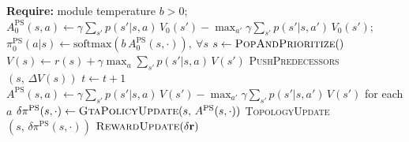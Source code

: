 \documentclass[10pt,a4paper]{article}
\begin{document}
\begin{algorithm}[!h]
\caption{DP + GTA-PS}
\begin{algorithmic}[1]
\Statex \textbf{Require:} module temperature $b>0$;\quad $A^{\mathrm{PS}}_0(s,a) \gets \gamma\sum_{s'} p(s'|s,a)\,V_0(s') - \max_{a'}\gamma\sum_{s'} p(s'|s,a')\,V_0(s')$;\quad $\pi^{\mathrm{PS}}_0(a|s) \gets \mathrm{softmax}(b\,A^{\mathrm{PS}}_0(s,\cdot)),\ \forall s$
   
    \State $s \gets \textsc{PopAndPrioritize}()$
    \State $V(s) \gets r(s) + \gamma\max_a\sum_{s'} p(s'|s,a)\,V(s')$ 
    \State \textsc{PushPredecessors}$(s,\, \Delta V(s))$
  \EndFor
  \State $t \leftarrow t + 1$
    \State $A^{\mathrm{PS}}(s,a) \gets \gamma\sum_{s'} p(s'|s,a)\,V(s') - \max_{a'}\gamma\sum_{s'} p(s'|s,a')\,V(s')$ for each $a$ 
    \State $\delta\pi^{\mathrm{PS}}(s,\cdot) \gets \textsc{GtaPolicyUpdate}(s,\,A^{\mathrm{PS}}(s,\cdot))$ 
    \State \textsc{TopologyUpdate}$(s,\,\delta\pi^{\mathrm{PS}}(s,\cdot))$ 
  \EndFor
   $\textsc{RewardUpdate}(\delta\mathbf{r})$ \EndIf
\EndWhile
\end{algorithmic}
\end{algorithm}
 
\end{document}
